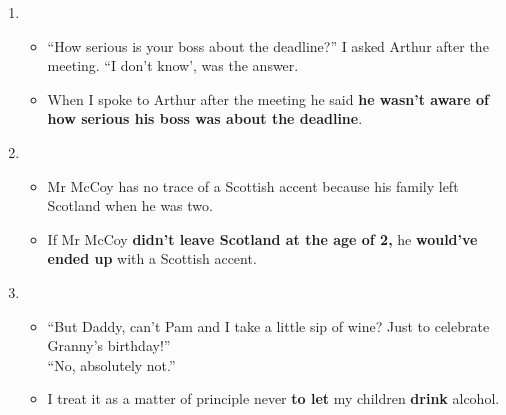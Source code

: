 \documentclass[a4paper]{article}
\begin{document}
\begin{enumerate}
    \item \begin{itemize}
        \item ``How serious is your boss about the deadline?'' I asked Arthur after the meeting. ``I don't know', was the answer.
        \item When I spoke to Arthur after the meeting he said {\bf he wasn't aware of how serious his boss was about the deadline}.
    \end{itemize}
    \item \begin{itemize}
        \item Mr McCoy has no trace of a Scottish accent because his family left Scotland when he was two.
        \item If Mr McCoy {\bf didn't leave Scotland at the age of 2,} he {\bf would've ended up} with a Scottish accent.
    \end{itemize}
    \item \begin{itemize}
        \item ``But Daddy, can't Pam and I take a little sip of wine? Just to celebrate Granny's birthday!''\\``No, absolutely not.''
        \item I treat it as a matter of principle never {\bf to let} my children {\bf drink} alcohol.
    \end{itemize}
\end{enumerate}
\end{document}
